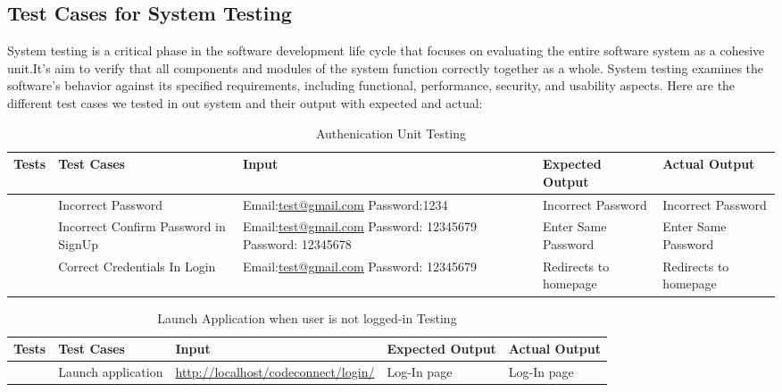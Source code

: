 \subsection{Test Cases for System Testing}
System testing is a critical phase in the software development life cycle that focuses on evaluating the entire software system as a cohesive unit.It's aim to verify that all components and modules of the system function correctly together as a whole. System testing examines the software's behavior against its specified requirements, including functional, performance, security, and usability aspects.
\newline
 Here are the different test cases we tested in out system and their output with expected and actual:
\begin{table}[H]
    \caption{Authenication Unit Testing}
        \label{}
        \begin{tabularx}{\textwidth}{|>{\raggedright\arraybackslash}p{0.3in}|Y|Y|Y|Y|}
        \hline
        Tests & Test Cases & Input & Expected Output & Actual Output \\
         & Incorrect Password& Email:\url{test@gmail.com} Password:1234& Incorrect Password& Incorrect Password \\
             & Incorrect Confirm Password in SignUp & Email:\url{test@gmail.com}
            Password: 12345679
            Password: 12345678 & Enter Same Password & Enter Same Password \\
             & Correct Credentials In Login & Email:\url{test@gmail.com}
            Password: 12345679 & Redirects to homepage & Redirects to homepage \\
            \hline
\end{tabularx}
\end{table}

\begin{table}[H]
    \caption{Launch Application when user is not logged-in Testing}
        \label{}
        \begin{tabularx}{\textwidth}{|>{\raggedright\arraybackslash}p{0.3in}|Y|Y|Y|Y|}
        \hline
        Tests & Test Cases & Input &Expected Output & Actual Output \\
         & Launch application& \url{http://localhost/codeconnect/login/}& Log-In page& Log-In page \\
            \hline
\end{tabularx}
\end{table}


